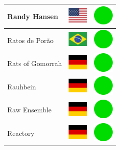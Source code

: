 \documentclass[12pt, a4paper, twoside]{report}
\begin{document}
\begin{center}
\begin{longtable}{|p{5cm}|p{2cm}|p{2cm}|}
 Randy Hansen                                               & \includegraphics[width=1cm]{../img/flags/us} &   \includegraphics[width=1cm]{../likes/y} \\ \hline
 Ratos de Porão                                             & \includegraphics[width=1cm]{../img/flags/br} &   \includegraphics[width=1cm]{../likes/y} \\ \hline
 Rats of Gomorrah                                           & \includegraphics[width=1cm]{../img/flags/de} &   \includegraphics[width=1cm]{../likes/y} \\ \hline
 Rauhbein                                                   & \includegraphics[width=1cm]{../img/flags/de} &   \includegraphics[width=1cm]{../likes/y} \\ \hline
 Raw Ensemble                                               & \includegraphics[width=1cm]{../img/flags/de} &   \includegraphics[width=1cm]{../likes/y} \\ \hline
 Reactory                                                   & \includegraphics[width=1cm]{../img/flags/de} &   \includegraphics[width=1cm]{../likes/y} \\ \hline

\end{longtable}
\end{center}
\end{document}
